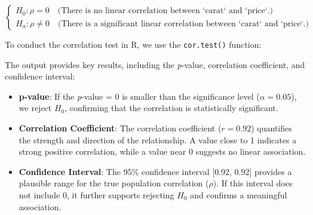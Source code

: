 \documentclass[
  11pt,
]{book}
\makeatletter
\newenvironment{Shaded}{}{}
\newcommand{\FunctionTok}[1]{#1}
\newcommand{\NormalTok}[1]{#1}
\newcommand{\OtherTok}[1]{\textcolor[rgb]{0.39,0.39,0.39}{#1}}
\newcommand{\SpecialCharTok}[1]{\textcolor[rgb]{0.39,0.39,0.39}{#1}}
\newcommand{\StringTok}[1]{\textcolor[rgb]{0.39,0.39,0.39}{#1}}
\providecommand{\tightlist}{%
  \setlength{\itemsep}{0pt}\setlength{\parskip}{0pt}}
\newenvironment{kframe}{%
\medskip{}
\setlength{\fboxsep}{.8em}
 \def\at@end@of@kframe{}%
 \ifinner\ifhmode%
  \def\at@end@of@kframe{\end{minipage}}%
  \begin{minipage}{\columnwidth}%
 \fi\fi%
 \def\FrameCommand##1{\hskip\@totalleftmargin \hskip-\fboxsep
 \colorbox{shadecolor}{##1}\hskip-\fboxsep
     \hskip-\linewidth \hskip-\@totalleftmargin \hskip\columnwidth}%
 \MakeFramed {\advance\hsize-\width
   \@totalleftmargin\z@ \linewidth\hsize
   \@setminipage}}%
 {\par\unskip\endMakeFramed%
 \at@end@of@kframe}
\renewenvironment{Shaded}{\begin{kframe}}{\end{kframe}}
\theoremstyle{definition}
\theoremstyle{definition}
\theoremstyle{definition}
\theoremstyle{definition}
\theoremstyle{remark}
\makeatother
\begin{document}
\[
\begin{cases}
    H_0: \rho   =  0 \quad \text{(There is no linear correlation between `carat` and `price`.)} \\
    H_a: \rho \neq 0 \quad \text{(There is a significant linear correlation between `carat` and `price`.)}
\end{cases}
\]

To conduct the correlation test in R, we use the \texttt{cor.test()} function:

\begin{Shaded}
\end{Shaded}

The output provides key results, including the \emph{p}-value, correlation coefficient, and confidence interval:

\begin{itemize}
\tightlist
\item
  \textbf{p-value}: If the \emph{p}-value = 0 is smaller than the significance level (\(\alpha = 0.05\)), we reject \(H_0\), confirming that the correlation is statistically significant.
\item
  \textbf{Correlation Coefficient}: The correlation coefficient (\(r = 0.92\)) quantifies the strength and direction of the relationship. A value close to 1 indicates a strong positive correlation, while a value near 0 suggests no linear association.
\item
  \textbf{Confidence Interval}: The 95\% confidence interval {[}0.92, 0.92{]} provides a plausible range for the true population correlation (\(\rho\)). If this interval does not include 0, it further supports rejecting \(H_0\) and confirms a meaningful association.
\end{itemize}
\end{document}
